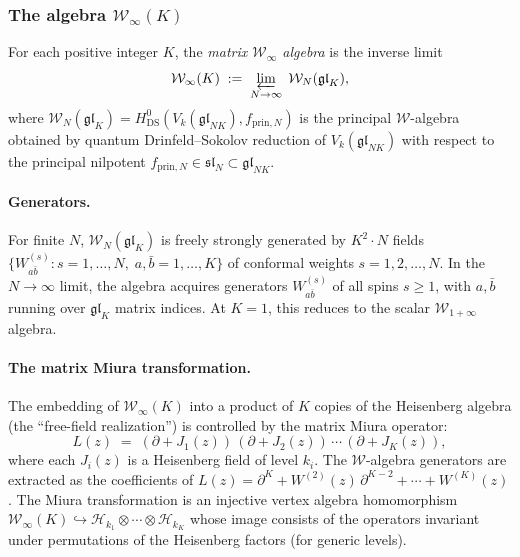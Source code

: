 \subsubsection{The algebra \texorpdfstring{$\mathcal{W}_\infty(K)$}{W-infinity(K)}}

\begin{definition}
\label{def:W-infinity-K}
For each positive integer $K$, the \emph{matrix $\mathcal{W}_\infty$ algebra}
is the inverse limit
\[
\mathcal{W}_\infty(K)
\;:=\;
\varprojlim_{N \to \infty}\;
\mathcal{W}_N(\mathfrak{gl}_K),
\]
where $\mathcal{W}_N(\mathfrak{gl}_K) = H^0_{\mathrm{DS}}(V_k(\mathfrak{gl}_{NK}),
f_{\mathrm{prin},N})$ is the principal $\mathcal{W}$-algebra obtained
by quantum Drinfeld--Sokolov reduction of $V_k(\mathfrak{gl}_{NK})$
with respect to the principal nilpotent
$f_{\mathrm{prin},N} \in \mathfrak{sl}_N \subset \mathfrak{gl}_{NK}$.
\end{definition}

\paragraph{Generators.}
For finite $N$, $\mathcal{W}_N(\mathfrak{gl}_K)$ is freely strongly
generated by $K^2 \cdot N$ fields
$\{W^{(s)}_{a\bar b} : s = 1, \ldots, N,\; a,\bar b = 1, \ldots, K\}$
of conformal weights $s = 1, 2, \ldots, N$. In the $N \to \infty$ limit,
the algebra acquires generators $W^{(s)}_{a\bar b}$ of all spins
$s \ge 1$, with $a, \bar b$ running over $\mathfrak{gl}_K$ matrix indices.
At $K = 1$, this reduces to the scalar $\mathcal{W}_{1+\infty}$ algebra.

\paragraph{The matrix Miura transformation.}
The embedding of $\mathcal{W}_\infty(K)$ into a product of $K$ copies of the
Heisenberg algebra (the ``free-field realization'') is controlled by the
matrix Miura operator:
\begin{equation}\label{eq:matrix-miura}
L(z)
\;=\;
(\partial + J_1(z))\,(\partial + J_2(z))\, \cdots\, (\partial + J_K(z)),
\end{equation}
where each $J_i(z)$ is a Heisenberg field of level $k_i$. The
$\mathcal{W}$-algebra generators are extracted as the coefficients of
$L(z) = \partial^K + W^{(2)}(z)\, \partial^{K-2} + \cdots + W^{(K)}(z)$.
The Miura transformation is an injective vertex algebra homomorphism
$\mathcal{W}_\infty(K) \hookrightarrow
\mathcal{H}_{k_1} \otimes \cdots \otimes \mathcal{H}_{k_K}$
whose image consists of the operators invariant under permutations of the
Heisenberg factors (for generic levels).

